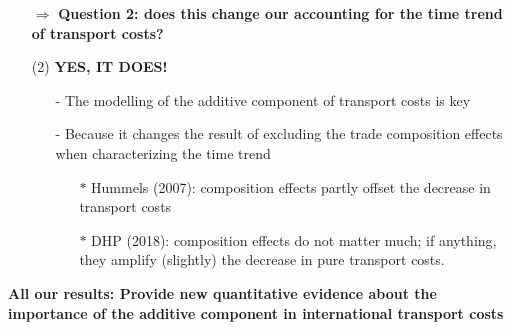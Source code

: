 \documentclass[10 pt,Helvetica, french]{beamer}
\begin{document}

\begin{frame}
\begin{itemize}
\item[$\Rightarrow$] \textbf{Question 2: does this change our accounting for the time trend of transport costs?} \vspace{0.1cm}
\pause
\item[(2)] \textbf{YES, IT DOES!} \vspace{0.2cm}
\begin{itemize}
\item[-] The modelling of the additive component of transport costs is key \vspace{0.1cm}
\item[-] Because it changes the result of excluding the trade composition effects when characterizing the time trend \vspace{0.1cm}
\pause
\begin{itemize}
\item[$\ast$] Hummels (2007): composition effects partly offset the decrease in transport costs  \vspace{0.1cm} %
\item[$\ast$] DHP (2018): composition effects do not matter much; if anything, they amplify (slightly) the decrease in pure transport costs.  \vspace{0.1cm}
\end{itemize}
\end{itemize}
\pause
\end{itemize}
\textbf{All our results: Provide new quantitative evidence about the importance of the additive component in international transport costs}

\end{frame}

\end{document}
